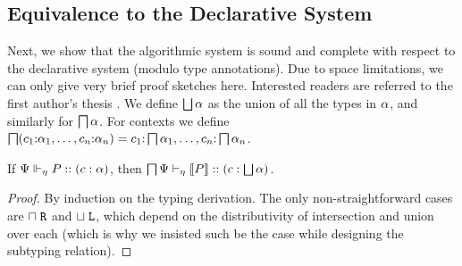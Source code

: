 \documentclass[submission,copyright,creativecommons]{eptcs}
\renewcommand{\intersect}{\mathrel{\sqcap}}
\renewcommand{\union}{\mathrel{\sqcup}}
\newcommand{\m}[1]{\mathsf{#1}}
\begin{document}


\subsection{Equivalence to the Declarative System}

Next, we show that the algorithmic system is sound and complete with respect to the declarative system (modulo type annotations). Due to space limitations, we can only give very brief proof sketches here. Interested readers are referred to the first author's thesis \cite{Acay16}.  We define $\operatorname{\bigsqcup}\alpha$ as the union of all the types in $\alpha$, and similarly for $\operatorname{\bigsqcap}\alpha$.  For contexts
we define $\operatorname{\bigsqcap}(c_1{:}\alpha_1, \ldots, c_n{:}\alpha_n) = c_1{:}\operatorname{\bigsqcap}\alpha_1, \ldots, c_n{:}\operatorname{\bigsqcap}\alpha_n$.

\begin{theorem}
  If ${\Psi} \Vdash_{\eta} P :: (c : \alpha)$, then ${\operatorname{\bigsqcap}\Psi} \vdash_{\eta} \left \llbracket {P} \right \rrbracket :: (c : \operatorname{\bigsqcup} \alpha)$.
\end{theorem}
\begin{proof}
  By induction on the typing derivation. The only non-straightforward cases are $\intersect\Right$ and $\union\Left$, which depend on the distributivity of intersection and union over each (which is why we insisted such be the case while designing the subtyping relation).
\end{proof}
\end{document}
